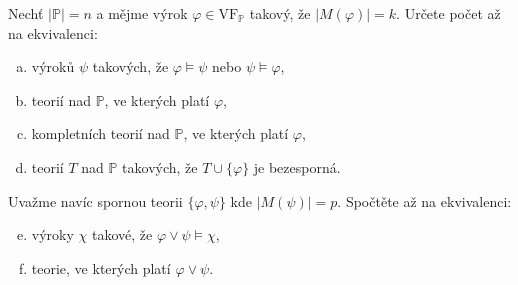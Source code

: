 \begin{problem}

    Nechť $|\mathbb{P}|=n$ a mějme výrok $\varphi\in\mathrm{VF}_{\mathbb{P}}$ takový, že $|M(\varphi)|=k$. Určete počet až na ekvivalenci:
    \begin{enumerate}[(a)]
        \item výroků $\psi$ takových, že $\varphi \models \psi$ nebo $\psi \models \varphi$,
        \item teorií nad $\mathbb{P}$, ve kterých platí $\varphi$,
        \item kompletních teorií nad $\mathbb{P}$, ve kterých platí $\varphi$,
        \item teorií $T$ nad $\mathbb{P}$ takových, že $T \cup \{\varphi\}$ je bezesporná.
    \end{enumerate}
    Uvažme navíc spornou teorii $\{\varphi,\psi\}$ kde $|M(\psi)|=p$. Spočtěte až na ekvivalenci:
    \begin{enumerate}[(a)]\setcounter{enumi}{4}
        \item výroky $\chi$ takové, že $\varphi \vee \psi \models \chi$, 
        \item teorie, ve kterých platí $\varphi \vee \psi$.
    \end{enumerate}


\end{problem}
